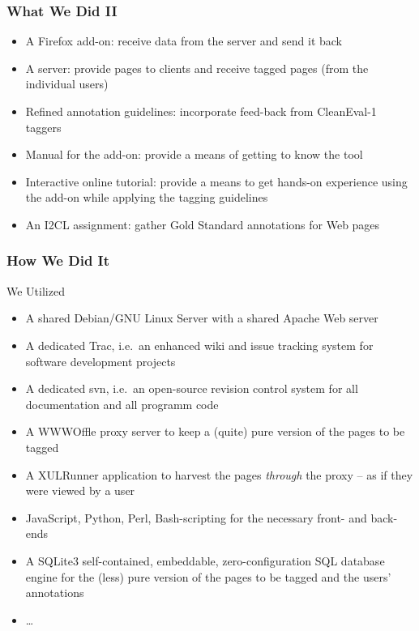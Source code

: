 \documentclass{beamer}
\begin{document}
\begin{frame}
\frametitle{What We Did II}
		
	\begin{block}{}
		\begin{itemize}
			\item A Firefox add-on: receive data from the server and send it back  
			\item A server: provide pages to clients and receive tagged pages (from the individual users)
			\item Refined annotation guidelines: incorporate feed-back from CleanEval-1 taggers
			\item Manual for the add-on: provide a means of getting to know the tool
			\item Interactive online tutorial: provide a means to get hands-on experience using the add-on while applying the tagging guidelines
			\item An I2CL assignment: gather Gold Standard annotations for Web pages  
		\end{itemize}
	\end{block}

\end{frame}



\begin{frame}[shrink=4]
\frametitle{How We Did It}

	\begin{block}{We Utilized}
		\begin{itemize}
			\item A shared Debian/GNU Linux Server with a shared Apache Web server
			\item A dedicated Trac, i.e.~an enhanced wiki and issue tracking system for software development projects
			\item A dedicated svn, i.e.~an open-source revision control system for all documentation and all programm code
			\item A WWWOffle proxy server to keep a (quite) pure version of the pages to be tagged
			\item A XULRunner application to harvest the pages \textit{through} the proxy -- as if they were viewed by a user
			\item JavaScript, Python, Perl, Bash-scripting for the necessary front- and back-ends
			\item A SQLite3 self-contained, embeddable, zero-configuration SQL database engine for the (less) pure version of the pages to be tagged and the users' annotations
			\item \ldots
		\end{itemize}
	\end{block}

\end{frame}
\end{document}
